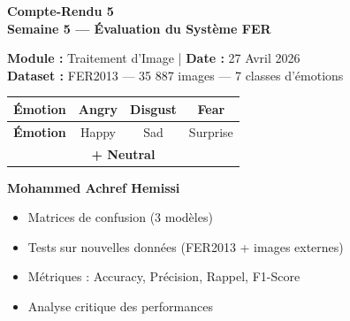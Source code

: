 \documentclass[12pt,a4paper]{article}
\begin{document}
\begin{titlepage}
  \centering
  \vspace*{1cm}

  {\Huge\bfseries\color{primary} Compte-Rendu 5}\\[0.4cm]
  {\large\bfseries Semaine 5 — Évaluation du Système FER}\\[1cm]

  \begin{tcolorbox}[colback=lightgray, colframe=primary, width=0.85\textwidth,
                    arc=4pt, title={\bfseries Projet : Reconnaissance des Émotions Faciales (FER2013)}]
    \begin{center}
      \textbf{Module :} Traitement d'Image \quad|\quad
      \textbf{Date :} 27 Avril 2026\\[0.3cm]
      \textbf{Dataset :} FER2013 — 35 887 images — 7 classes d'émotions\\[0.2cm]
      \begin{tabular}{lccc}
        \toprule
        \textbf{Émotion} & Angry & Disgust & Fear \\
        \midrule
        \textbf{Émotion} & Happy & Sad & Surprise \\
        \midrule
        \multicolumn{4}{c}{\textbf{+ Neutral}} \\
        \bottomrule
      \end{tabular}
    \end{center}
  \end{tcolorbox}

  \vspace{1cm}
  {\large\bfseries Mohammed Achref Hemissi}\\[0.5cm]

  \vfill
  \begin{tcolorbox}[colback=primary!10, colframe=primary, arc=4pt,
                    title={\bfseries Livrable CR5}]
    \begin{itemize}[noitemsep]
      \item[$\checkmark$] Matrices de confusion (3 modèles)
      \item[$\checkmark$] Tests sur nouvelles données (FER2013 + images externes)
      \item[$\checkmark$] Métriques : Accuracy, Précision, Rappel, F1-Score
      \item[$\checkmark$] Analyse critique des performances
    \end{itemize}
  \end{tcolorbox}
\end{titlepage}
\end{document}
